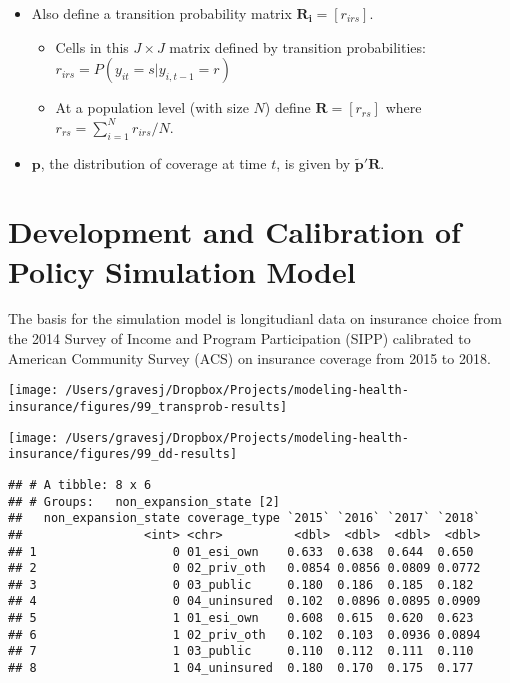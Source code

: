 \documentclass[]{article}
\begin{document}
\begin{itemize}
\item
  Also define a transition probability matrix
  \(\mathbf{R_i} = [r_{irs}]\).

  \begin{itemize}
  \item
    Cells in this \(J \times J\) matrix defined by transition
    probabilities: \(r_{irs} = P(y_{it} = s | y_{i,t-1}=r)\)
  \item
    At a population level (with size \(N\)) define
    \(\mathbf{R} = [r_{rs}]\) where \(r_{rs} = \sum_{i=1}^Nr_{irs}/N\).
  \end{itemize}
\item
  \(\mathbf{p}\), the distribution of coverage at time \(t\), is given
  by \(\mathbf{\tilde{p}'R}\).
\end{itemize}

\hypertarget{development-and-calibration-of-policy-simulation-model}{%
\section{Development and Calibration of Policy Simulation
Model}\label{development-and-calibration-of-policy-simulation-model}}

The basis for the simulation model is longitudianl data on insurance
choice from the 2014 Survey of Income and Program Participation (SIPP)
calibrated to American Community Survey (ACS) on insurance coverage from
2015 to 2018.

\texttt{[image: /Users/gravesj/Dropbox/Projects/modeling-health-insurance/figures/99\_transprob-results]}

\texttt{[image: /Users/gravesj/Dropbox/Projects/modeling-health-insurance/figures/99\_dd-results]}

\begin{verbatim}
## # A tibble: 8 x 6
## # Groups:   non_expansion_state [2]
##   non_expansion_state coverage_type `2015` `2016` `2017` `2018`
##                 <int> <chr>          <dbl>  <dbl>  <dbl>  <dbl>
## 1                   0 01_esi_own    0.633  0.638  0.644  0.650 
## 2                   0 02_priv_oth   0.0854 0.0856 0.0809 0.0772
## 3                   0 03_public     0.180  0.186  0.185  0.182 
## 4                   0 04_uninsured  0.102  0.0896 0.0895 0.0909
## 5                   1 01_esi_own    0.608  0.615  0.620  0.623 
## 6                   1 02_priv_oth   0.102  0.103  0.0936 0.0894
## 7                   1 03_public     0.110  0.112  0.111  0.110 
## 8                   1 04_uninsured  0.180  0.170  0.175  0.177
\end{verbatim}
\end{document}
